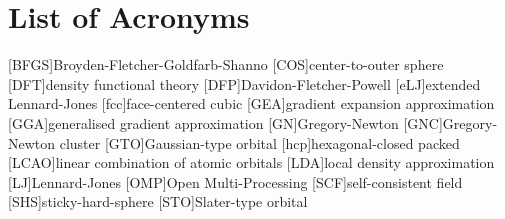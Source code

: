 
\chapter*{List of Acronyms}

\begin{acronym}[ABCDEFGHIJK]
    [BFGS]{Broyden-Fletcher-Goldfarb-Shanno}
    [COS]{center-to-outer sphere}
    [DFT]{density functional theory}
    [DFP]{Davidon-Fletcher-Powell}
    [eLJ]{extended Lennard-Jones}
    [fcc]{face-centered cubic}
	[GEA]{gradient expansion approximation}
	[GGA]{generalised gradient approximation}
    [GN]{Gregory-Newton}
    [GNC]{Gregory-Newton cluster}
    [GTO]{Gaussian-type orbital}
    [hcp]{hexagonal-closed packed}
    [LCAO]{linear combination of atomic orbitals}
    [LDA]{local density approximation}
    [LJ]{Lennard-Jones}
    [OMP]{Open Multi-Processing}
    [SCF]{self-consistent field}
    [SHS]{sticky-hard-sphere}
    [STO]{Slater-type orbital}
\end{acronym}
